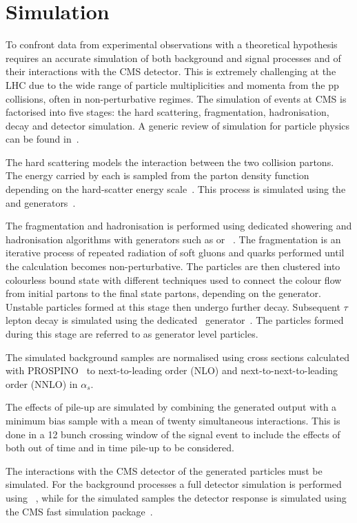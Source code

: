 \section{Simulation}

To confront data from experimental observations with a theoretical hypothesis requires an accurate
simulation of both background and signal processes and of their interactions with the CMS detector.
This is extremely challenging at the LHC due to the wide range of particle multiplicities and momenta 
from the pp collisions, often in non-perturbative regimes. The simulation of events at CMS 
is factorised into five stages: the hard scattering, fragmentation, hadronisation, decay and 
detector simulation. A generic review of simulation for particle physics can be found in~\cite{sim_rev}.

The hard scattering models the interaction between the two collision partons. The energy carried by each
is sampled from the parton density function depending on the hard-scatter energy scale~\cite{pdf}. 
This process is simulated using the \PYTHIA and \MADGRAPH generators~\cite{PYTHIA,MADGRAPH}. 

The fragmentation and hadronisation is performed using dedicated showering and hadronisation algorithms with
generators such as \PYTHIA or \HERWIG~\cite{PYTHIA,HERWIG}. The fragmentation is an iterative process of repeated 
radiation of soft gluons and quarks performed until the calculation becomes non-perturbative. 
The particles are then clustered into colourless bound state with different techniques used
to connect the colour flow from initial partons to the final state partons, depending on the generator. 
Unstable particles formed at this stage then undergo further decay. Subsequent $\tau$ lepton 
decay is simulated using the dedicated \TAUOLA~generator~\cite{TAUOLA}. The particles formed 
during this stage are referred to as generator level particles. 

The simulated background samples are normalised using cross sections calculated with PROSPINO~\cite{Prospino}
to next-to-leading order (NLO) and next-to-next-to-leading order (NNLO) in $\alpha_s$.

The effects of pile-up are simulated by combining the generated output with a minimum bias sample 
with a mean of twenty simultaneous interactions. This is done in a 12 bunch 
crossing window of the signal event to include the effects of both 
out of time and in time pile-up to be considered.

The interactions with the CMS detector of the generated particles must be simulated. For the background processes
a full detector simulation is performed using \GEANTfour~\cite{GEANT}, while for the simulated
samples the detector response is simulated using the CMS fast simulation package~\cite{fastsim}.
